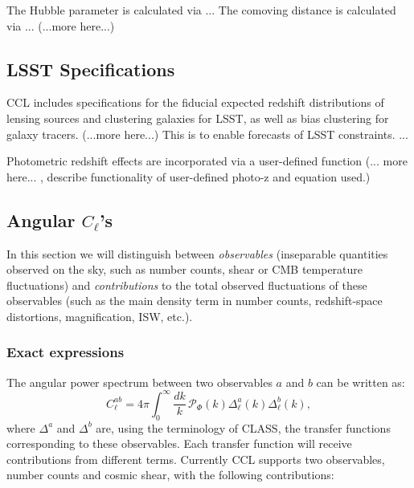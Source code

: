 \documentclass[\docopts]{\docclass}
\begin{document}
The Hubble parameter is calculated via ... The comoving distance is calculated via ... (...more here...)


\subsection{LSST Specifications}
\label{sec:specs}

CCL includes specifications for the fiducial expected redshift distributions of lensing sources and clustering galaxies for LSST, as well as bias clustering for galaxy tracers. (...more here...) This is to enable forecasts of LSST constraints. ... 

Photometric redshift effects are incorporated via a user-defined function (... more here... , describe functionality of user-defined photo-z and equation used.)

\subsection{Angular $C_\ell$'s}
\label{sec:cl}

In this section we will distinguish between {\sl observables} (inseparable quantities observed on the sky, such as number counts, shear or CMB temperature fluctuations) and {\sl contributions} to the total observed fluctuations of these observables (such as the main density term in number counts, redshift-space distortions, magnification, ISW, etc.).

\subsubsection{Exact expressions}
The angular power spectrum between two observables $a$ and $b$ can be written as:
\begin{equation}
 C^{ab}_\ell=4\pi\int_0^\infty \frac{dk}{k}\,\mathcal{P}_\Phi(k)\Delta^a_\ell(k)\Delta^b_\ell(k),
\end{equation}
where $\Delta^a$ and $\Delta^b$ are, using the terminology of CLASS, the transfer functions corresponding to these observables. Each transfer function will receive contributions from different terms. Currently CCL supports two observables, number counts and cosmic shear, with the following contributions:
\end{document}
